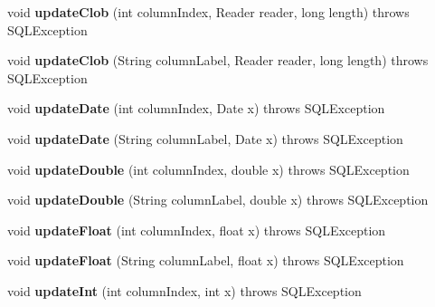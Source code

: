 \begin{DoxyCompactItemize}
void {\bfseries update\+Clob} (int column\+Index, Reader reader, long length)  throws S\+Q\+L\+Exception 
\item 
\mbox{\label{classsimpledb_1_1jdbc_1_1ResultSetAdapter_a18f8df22ac6cd8dab5c60345e05f7749}} 
void {\bfseries update\+Clob} (String column\+Label, Reader reader, long length)  throws S\+Q\+L\+Exception 
\item 
\mbox{\label{classsimpledb_1_1jdbc_1_1ResultSetAdapter_aeb1bc800cecaba02fcbb7d86a3bb219b}} 
void {\bfseries update\+Date} (int column\+Index, Date x)  throws S\+Q\+L\+Exception 
\item 
\mbox{\label{classsimpledb_1_1jdbc_1_1ResultSetAdapter_ad3141b57ca642e2be3dd406d0fca3b24}} 
void {\bfseries update\+Date} (String column\+Label, Date x)  throws S\+Q\+L\+Exception 
\item 
\mbox{\label{classsimpledb_1_1jdbc_1_1ResultSetAdapter_a6aa83182a4a16b656ec1cab9e34e88ba}} 
void {\bfseries update\+Double} (int column\+Index, double x)  throws S\+Q\+L\+Exception 
\item 
\mbox{\label{classsimpledb_1_1jdbc_1_1ResultSetAdapter_aaa08cae7405c1156003444c7c62533c0}} 
void {\bfseries update\+Double} (String column\+Label, double x)  throws S\+Q\+L\+Exception 
\item 
\mbox{\label{classsimpledb_1_1jdbc_1_1ResultSetAdapter_a8f3e8b06f1d5f31853fa60815ceca74f}} 
void {\bfseries update\+Float} (int column\+Index, float x)  throws S\+Q\+L\+Exception 
\item 
\mbox{\label{classsimpledb_1_1jdbc_1_1ResultSetAdapter_a1ecc2fd3405c235935c64b0ab9a585b5}} 
void {\bfseries update\+Float} (String column\+Label, float x)  throws S\+Q\+L\+Exception 
\item 
\mbox{\label{classsimpledb_1_1jdbc_1_1ResultSetAdapter_ac0dafe0a66bb6e0854717f637ba84c41}} 
void {\bfseries update\+Int} (int column\+Index, int x)  throws S\+Q\+L\+Exception 

\end{DoxyCompactItemize}
